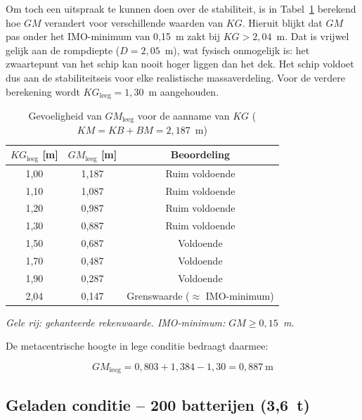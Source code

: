 Om toch een uitspraak te kunnen doen over de stabiliteit, is in
Tabel~\ref{tab:KG_gevoeligheid} berekend hoe $GM$ verandert voor
verschillende waarden van $KG$. Hieruit blijkt dat $GM$ pas onder het
IMO-minimum van 0{,}15~m zakt bij $KG > 2{,}04$~m. Dat is vrijwel gelijk
aan de rompdiepte ($D = 2{,}05$~m), wat fysisch onmogelijk is: het
zwaartepunt van het schip kan nooit hoger liggen dan het dek. Het schip
voldoet dus aan de stabiliteitseis voor elke realistische massaverdeling.
Voor de verdere berekening wordt $KG_\mathrm{leeg} = 1{,}30$~m aangehouden.

\begin{table}[H]
\centering
\caption{Gevoeligheid van $GM_\mathrm{leeg}$ voor de aanname van $KG$
         ($KM = KB + BM = 2{,}187$~m)}
\label{tab:KG_gevoeligheid}
\small
\begin{tabular}{ccc}
\toprule
$KG_\mathrm{leeg}$ [m] & $GM_\mathrm{leeg}$ [m] & Beoordeling \\
\midrule
1{,}00 & 1{,}187 & Ruim voldoende \\
1{,}10 & 1{,}087 & Ruim voldoende \\
1{,}20 & 0{,}987 & Ruim voldoende \\
\rowcolor{yellow!20}
1{,}30 & 0{,}887 & Ruim voldoende \\
1{,}50 & 0{,}687 & Voldoende \\
1{,}70 & 0{,}487 & Voldoende \\
1{,}90 & 0{,}287 & Voldoende \\
2{,}04 & 0{,}147 & Grenswaarde ($\approx$ IMO-minimum) \\
\bottomrule
\end{tabular}
\vspace{4pt}

\noindent\footnotesize
\textit{Gele rij: gehanteerde rekenwaarde. IMO-minimum: $GM \geq 0{,}15$~m.}
\end{table}

De metacentrische hoogte in lege conditie bedraagt daarmee:

\begin{equation}
    GM_\mathrm{leeg} = 0{,}803 + 1{,}384 - 1{,}30 = \boxed{0{,}887\ \mathrm{m}}
    \label{eq:GM_leeg}
\end{equation}

\subsection{Geladen conditie -- 200 batterijen (3{,}6~t)}

